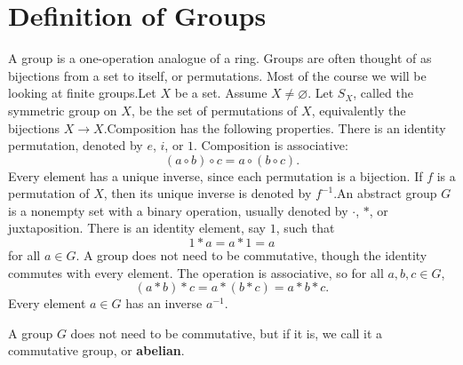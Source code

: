 
\section{Definition of Groups}

A group is a one-operation analogue of a ring.
Groups are often thought of as bijections from a set to itself, or permutations.
Most of the course we will be looking at finite groups.Let $X$ be a set.
Assume $X\neq \varnothing$.
Let $S_X$, called the symmetric group on $X$, be the set of permutations of $X$, equivalently the bijections $X\to X$.Composition has the following properties.
There is an identity permutation, denoted by $e$, $i$, or $1$.
Composition is associative:
\[
    (a\circ b)\circ c = a\circ (b\circ c).
\]
Every element has a unique inverse, since each permutation is a bijection.
If $f$ is a permutation of $X$, then its unique inverse is denoted by $f^{-1}$.An abstract group $G$ is a nonempty set with a binary operation, usually denoted by $\cdot$, $*$, or juxtaposition.
There is an identity element, say $1$, such that
\[
    1*a = a*1 = a
\]
for all $a\in G$.
A group does not need to be commutative, though the identity commutes with every element.
The operation is associative, so for all $a,b,c\in G$,
\[
    (a*b)*c = a*(b*c) = a*b*c.
\]
Every element $a\in G$ has an inverse $a^{-1}$.

\begin{definition}
    A group $G$ does not need to be commutative, but if it is, we call it a commutative group, or \textbf{abelian}.
\end{definition}


